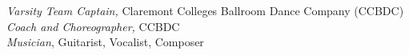\textit{Varsity Team Captain,} Claremont Colleges Ballroom Dance Company (CCBDC)  \\
\textit{Coach and Choreographer,} CCBDC\\
\textit{Musician}, Guitarist, Vocalist, Composer
